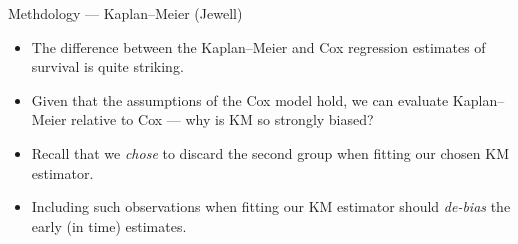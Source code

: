 \documentclass[12pt,t,handout]{beamer}
\begin{document}
\begin{frame}[c]{Methdology --- Kaplan--Meier (Jewell)}

\begin{center}
\begin{itemize}
  \itemsep12pt
  \item The difference between the Kaplan--Meier and Cox regression estimates of
    survival is quite striking.
  \item Given that the assumptions of the Cox model hold, we can evaluate
    Kaplan--Meier relative to Cox --- why is KM so strongly biased?
  \item Recall that we \textit{chose} to discard the second group when fitting
    our chosen KM estimator.
  \item Including such observations when fitting our KM estimator should
    \textit{de-bias} the early (in time) estimates.
\end{itemize}
\end{center}


\end{frame}

\end{document}
